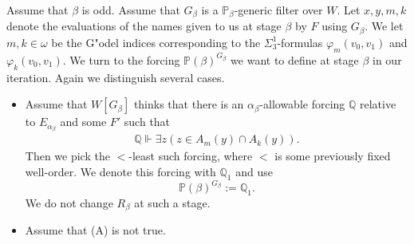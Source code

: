 \documentclass[a4paper,11pt]{article}
\newcommand{\forceP}{\mathbb{P}}
\newcommand{\forceQ}{\mathbb{Q}}
\begin{document}
Assume that $\beta$ is odd. Assume that $G_{\beta}$ is a $\forceP_{\beta}$-generic filter over $W$. Let $x,y,m,k$ denote the evaluations of the names given to us at stage $\beta$ by $F$ using $G_{\beta}$. We let $m, k \in \omega$ be the G"odel indices corresponding to the $\Sigma^1_3$-formulas $\varphi_m(v_0,v_1)$ and $\varphi_k(v_0,v_1)$.
We turn to the forcing $\forceP(\beta)^{G_{\beta}}$ we want to define at stage $\beta$ in our iteration.
Again we distinguish several cases.
\begin{itemize}
\item[(A)]  Assume that $W[G_{\beta}]$ thinks that there is an $\alpha_{\beta}$-allowable forcing $\forceQ$ relative to $E_{\alpha_{\beta}}$ and some $F'$ such that 
\begin{align*}
\forceQ \Vdash 
\exists z (z\in A_m(y) \cap A_k(y)).
\end{align*}
Then we pick the $<$-least such forcing, where $<$ is some previously fixed well-order. We denote this forcing with $\forceQ_1$
and use 
\[\forceP(\beta)^{G_{\beta}}:= \forceQ_1.\]
We do not change $R_{\beta}$ at such a stage.

\item[(B)] Assume that (A) is not true.

\begin{itemize} 


\end{itemize}
\end{itemize}
\end{document}
